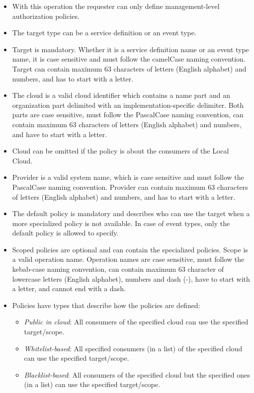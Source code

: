 \documentclass[a4paper]{arrowhead}
\begin{document}
\begin{itemize}
    \item With this operation the requester can only define management-level authorization policies. \item The target type can be a service definition or an event type. 
    \item Target is mandatory. Whether it is a service definition name or an event type name, it is case sensitive and must follow the camelCase naming convention. Target can contain maximum 63 characters of letters (English alphabet) and numbers, and has to start with a letter.
    \item The cloud is a valid cloud identifier which contains a name part and an organization part delimited with an implementation-specific delimiter. Both parts are case sensitive, must follow the PascalCase naming convention, can contain maximum 63 characters of letters (English alphabet) and numbers, and have to start with a letter.
    \item Cloud can be omitted if the policy is about the consumers of the Local Cloud.
    \item Provider is a valid system name, which is case sensitive and must follow the PascalCase naming convention. Provider can contain maximum 63 characters of letters (English alphabet) and numbers, and has to start with a letter.
    \item The default policy is mandatory and describes who can use the target when a more specialized policy is not available. In case of event types, only the default policy is allowed to specify.
    \item Scoped policies are optional and can contain the specialized policies. Scope is a valid operation name. Operation names are case sensitive, must follow the kebab-case naming convention, can contain maximum 63 character of lowercase letters (English alphabet), numbers and dash (-), have to start with a letter, and cannot end with a dash.
    \item Policies have types that describe how the policies are defined:
        \begin{itemize}
            \item \textit{Public in cloud}: All consumers of the specified cloud can use the specified target/scope.
            \item \textit{Whitelist-based}: All specified consumers (in a list) of the specified cloud can use the specified target/scope.
            \item \textit{Blacklist-based}: All consumers of the specified cloud but the specified ones (in a list) can use the specified target/scope.

\end{itemize}
\end{itemize}
\end{document}
